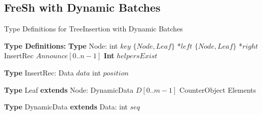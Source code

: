 \documentclass[a4paper,11pt,twoside,openany]{book}
\newcommand{\selam}[0]{\selectlanguage{american}}
\begin{document}
\selam

\pagestyle{plain}
\setcounter{page}{1}
\setcounter{tocdepth}{3}

\tableofcontents








 \pagestyle{headings}





    
\subsection{FreSh with Dynamic Batches}


\begin{algorithm}[t]
    \footnotesize
    \caption{Type Definitions for TreeInsertion with Dynamic Batches}
    \label{alg:tree-types-dynamic}
    \begin{algorithmic}[1]
        \Statex \textbf{Type Definitions:}
        \State \textbf{Type} Node:
        \State \quad int $\mathit{key}$
        \State \quad $\{Node,Leaf\}$ *$\mathit{left}$
        \State \quad $\{Node,Leaf\}$ *$\mathit{right}$
        \State \quad InsertRec $\mathit{Announce}[0..n-1]$
        \State \quad \textbf{Int} $\mathit{helpersExist}$

        \Statex
        \State \textbf{Type} InsertRec:
        \State \quad Data $\mathit{data}$
        \State \quad int $\mathit{position}$

        \Statex
        \State \textbf{Type} Leaf \textbf{extends} Node:
        \State \quad DynamicData $D[0..m-1]$
        \State \quad CounterObject Elements

        \Statex
        \State \textbf{Type} DynamicData \textbf{extends} Data:
        \State \quad int $\mathit{seq}$

    \end{algorithmic}
\end{algorithm}
\end{document}
